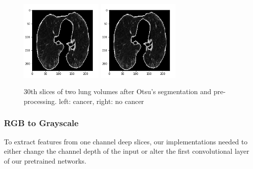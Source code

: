 \documentclass[twocolumn,10pt]{article}
\begin{document}
\begin{figure}[H]
\label{preprocessed_imgs}
\includegraphics[width=10.8em]{imgs/visual_crop_cancer.png}
\includegraphics[width=10.8em]{imgs/visual_crop_cancer.png}
\caption{30th slices of two lung volumes after Otsu's segmentation
and pre-processing. left: cancer, right: no cancer}
\end{figure}

\subsubsection{RGB to Grayscale}
To extract features from one channel deep slices, our implementations needed to
either change the channel depth of the input or alter the first convolutional
layer of our pretrained networks.
\end{document}
